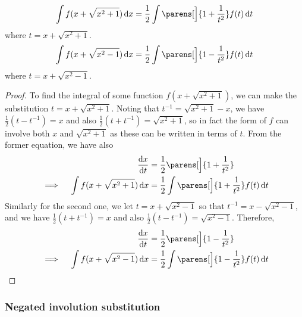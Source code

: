 \begin{theorem}
 \begin{equation*}
  \integ{f(x + \sqrt{x^2 + 1})}{x}
  = \frac 12 \integ{\parens[\Big]{1 + \frac 1{t^2}}f(t)}{t}
 \end{equation*}
 where \(t = x + \sqrt{x^2 + 1}\).
 \begin{equation*}
  \integ{f(x + \sqrt{x^2 - 1})}{x}
  = \frac 12 \integ{\parens[\Big]{1 - \frac 1{t^2}}f(t)}{t}
 \end{equation*}
 where \(t = x + \sqrt{x^2 - 1}\).
\end{theorem}
\begin{proof}
 To find the integral of some function \(f(x + \sqrt{x^2 + 1})\), we can make
 the substitution \(t = x + \sqrt{x^2 + 1}\). Noting that
 \(t^{-1} = \sqrt{x^2 + 1} - x\), we have \(\frac 12(t - t^{-1}) = x\)
 and also \(\frac 12(t + t^{-1}) = \sqrt{x^2 + 1}\), so in fact the form of
 \(f\) can involve both \(x\) and \(\sqrt{x^2 + 1}\) as these can be
 written in terms of \(t\). From the former equation, we have also
 \begin{alignat*}{2}
  && \dv<x>{t} &= \frac 12\parens[\Big]{1 + \frac 1{t^2}} \\
  &\implies{}& \integ{f(x + \sqrt{x^2 + 1})}{x}
  &= \frac 12 \integ{\parens[\Big]{1 + \frac 1{t^2}}f(t)}{t}
 \end{alignat*}
 Similarly for the second one, we let \(t = x + \sqrt{x^2 - 1}\) so that
 \(t^{-1} = x - \sqrt{x^2 - 1}\), and we have \(\frac 12(t + t^{-1}) = x\)
 and also \(\frac 12(t - t^{-1}) = \sqrt{x^2 - 1}\). Therefore,
 \begin{alignat*}{2}
  && \dv<x>{t} &= \frac 12\parens[\Big]{1 - \frac 1{t^2}} \\
  &\implies{}& \integ{f(x + \sqrt{x^2 - 1})}{x}
  &= \frac 12 \integ{\parens[\Big]{1 - \frac 1{t^2}}f(t)}{t} \qedhere
 \end{alignat*}
\end{proof}

\subsubsection{Negated involution substitution}

